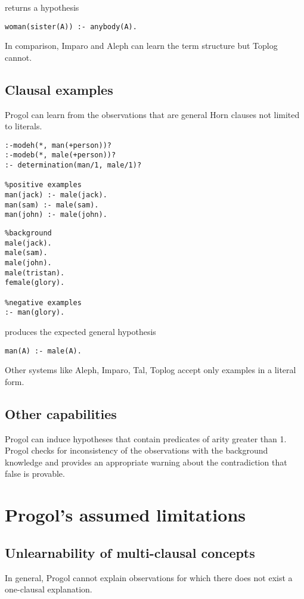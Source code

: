 returns a hypothesis
\begin{lstlisting}
woman(sister(A)) :- anybody(A).
\end{lstlisting}
In comparison, Imparo and Aleph can learn the term structure but Toplog cannot.

\subsection{Clausal examples}\label{progol_clausal_examples}
Progol can learn from the observations that are general Horn clauses not limited to literals.

\begin{minipage}[t]{.60\textwidth}
\begin{lstlisting}
:-modeh(*, man(+person))?
:-modeb(*, male(+person))?
:- determination(man/1, male/1)?

%positive examples
man(jack) :- male(jack).
man(sam) :- male(sam).
man(john) :- male(john).
\end{lstlisting}
\end{minipage}
\begin{minipage}[t]{.20\textwidth}
\begin{lstlisting}
%background
male(jack).
male(sam).
male(john).
male(tristan).
female(glory).

%negative examples
:- man(glory).
\end{lstlisting}
\end{minipage}

produces the expected general hypothesis
\begin{lstlisting}
man(A) :- male(A).
\end{lstlisting}

Other systems like Aleph, Imparo, Tal, Toplog accept only examples in a literal form.

\subsection{Other capabilities}
Progol can induce hypotheses that contain predicates of arity greater than 1. Progol checks for inconsistency of the observations with the background knowledge and provides an appropriate warning about the contradiction that false is provable.

\section{Progol's assumed limitations}
\subsection{Unlearnability of multi-clausal concepts}
In general, Progol cannot explain observations for which there does not exist a one-clausal explanation.


